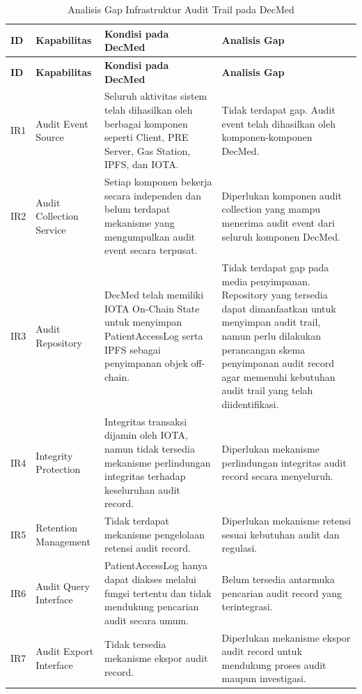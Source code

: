 \begin{xltabular}
{\textwidth}
{|>{\centering\arraybackslash}p{1cm}
 |>{\raggedright\arraybackslash}p{2.5cm}
 |>{\raggedright\arraybackslash}p{4.5cm}
 |X|}

\caption{Analisis Gap Infrastruktur Audit Trail pada DecMed}
\label{tab:gap-infrastruktur}\\

\hline
\textbf{ID} &
\textbf{Kapabilitas} &
\textbf{Kondisi pada DecMed} &
\textbf{Analisis Gap} \\
\hline
\endfirsthead

\hline
\textbf{ID} &
\textbf{Kapabilitas} &
\textbf{Kondisi pada DecMed} &
\textbf{Analisis Gap} \\
\hline
\endhead

\hline
\endfoot

\hline
\endlastfoot

IR1 &
Audit Event Source &
Seluruh aktivitas sistem telah dihasilkan oleh berbagai komponen seperti Client, PRE Server, Gas Station, IPFS, dan IOTA. &
Tidak terdapat gap. Audit event telah dihasilkan oleh komponen-komponen DecMed. \\
\hline

IR2 &
Audit Collection Service &
Setiap komponen bekerja secara independen dan belum terdapat mekanisme yang mengumpulkan audit event secara terpusat. &
Diperlukan komponen audit collection yang mampu menerima audit event dari seluruh komponen DecMed. \\
\hline

IR3 &
Audit Repository &
DecMed telah memiliki IOTA On-Chain State untuk menyimpan PatientAccessLog serta IPFS sebagai penyimpanan objek off-chain. &
Tidak terdapat gap pada media penyimpanan. Repository yang tersedia dapat dimanfaatkan untuk menyimpan audit trail, namun perlu dilakukan perancangan skema penyimpanan audit record agar memenuhi kebutuhan audit trail yang telah diidentifikasi.\\
\hline

IR4 &
Integrity Protection &
Integritas transaksi dijamin oleh IOTA, namun tidak tersedia mekanisme perlindungan integritas terhadap keseluruhan audit record. &
Diperlukan mekanisme perlindungan integritas audit record secara menyeluruh. \\
\hline

IR5 &
Retention Management &
Tidak terdapat mekanisme pengelolaan retensi audit record. &
Diperlukan mekanisme retensi sesuai kebutuhan audit dan regulasi. \\
\hline

IR6 &
Audit Query Interface &
PatientAccessLog hanya dapat diakses melalui fungsi tertentu dan tidak mendukung pencarian audit secara umum. &
Belum tersedia antarmuka pencarian audit record yang terintegrasi. \\
\hline

IR7 &
Audit Export Interface &
Tidak tersedia mekanisme ekspor audit record. &
Diperlukan mekanisme ekspor audit record untuk mendukung proses audit maupun investigasi. \\
\hline

\end{xltabular}

